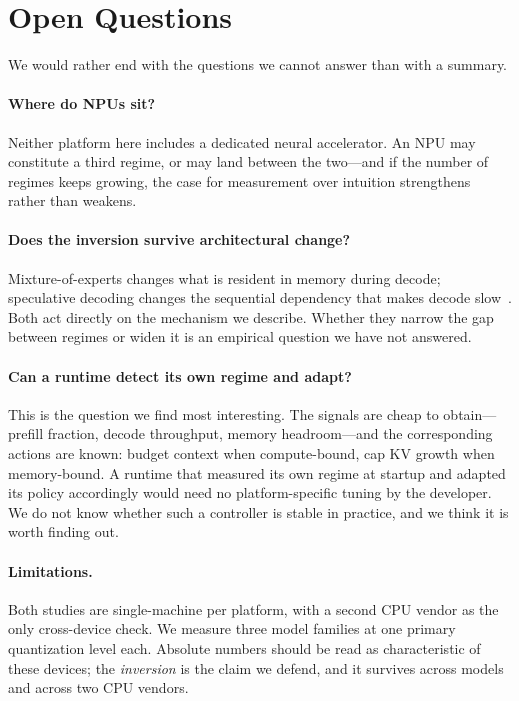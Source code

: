 \documentclass[sigconf,nonacm,10pt]{acmart}
\begin{document}
\section{Open Questions}
\label{sec:open}

We would rather end with the questions we cannot answer than with a summary.

\paragraph{Where do NPUs sit?} Neither platform here includes a dedicated neural accelerator. An NPU may
constitute a third regime, or may land between the two---and if the number of regimes keeps growing, the case
for measurement over intuition strengthens rather than weakens.

\paragraph{Does the inversion survive architectural change?} Mixture-of-experts changes what is resident in
memory during decode; speculative decoding changes the sequential dependency that makes decode
slow~\cite{leviathan2023speculative}. Both act directly on the mechanism we describe. Whether they narrow the
gap between regimes or widen it is an empirical question we have not answered.

\paragraph{Can a runtime detect its own regime and adapt?} This is the question we find most interesting. The
signals are cheap to obtain---prefill fraction, decode throughput, memory headroom---and the corresponding
actions are known: budget context when compute-bound, cap KV growth when memory-bound. A runtime that measured
its own regime at startup and adapted its policy accordingly would need no platform-specific tuning by the
developer. We do not know whether such a controller is stable in practice, and we think it is worth finding out.

\paragraph{Limitations.} Both studies are single-machine per platform, with a second CPU vendor as the only
cross-device check. We measure three model families at one primary quantization level each. Absolute numbers
should be read as characteristic of these devices; the \emph{inversion} is the claim we defend, and it survives
across models and across two CPU vendors.
\end{document}
